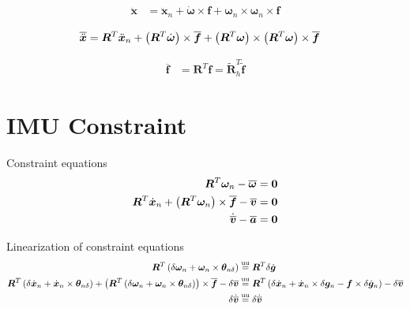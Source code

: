 \documentclass{article}
\newcommand{\T}[1]{\bm{#1}}
\newcommand{\TT}[1]{\bm{#1}}
\newcommand{\equu}{\overset{\text{uu}}{=}}
\begin{document}
\begin{align}
	\ddot{\T{x}}
	&=
	\ddot{\T{x}}_n
	+
	\dot{\T{\omega}} \times \T{f}
	+
	\T{\omega}_n \times \T{\omega}_n \times \T{f}
\end{align}

\begin{align}
	\overline{\ddot{\T{x}}}
	&=
	\TT{R}^T \ddot{\T{x}}_n
	+
	\plbr{\TT{R}^T \dot{\T{\omega}}} \times \overline{\T{f}}
	+
	\plbr{\TT{R}^T \T{\omega}} \times \plbr{\TT{R}^T \T{\omega}} \times \overline{\T{f}}
\end{align}

\begin{align}
	\overline{\T{f}}
	&=
	\TT{R}^T \T{f}
	=
	\tilde{\TT{R}}_h^T \tilde{\T{f}}
\end{align}

\section{IMU Constraint}
Constraint equations
\begin{subequations}
\begin{align}
	\TT{R}^T \T{\omega}_n - \overline{\T{\omega}}
	&=
	\T{0}
	\\
	\TT{R}^T \dot{\T{x}}_n
	+
	\plbr{\TT{R}^T \T{\omega}_n} \times \overline{\T{f}}
	-
	\overline{\T{v}}
	&=
	\T{0}
	\\
	\dot{\overline{\T{v}}}
	-
	\overline{\T{a}}
	&=
	\T{0}
\end{align}
\end{subequations}

Linearization of constraint equations
\begin{subequations}
\begin{align}
	\TT{R}^T \plbr{
		\delta\T{\omega}_n
		+
		\T{\omega}_n \times \T{\theta}_{n\delta}
	}
	&\equu
	\TT{R}^T \delta\dot{\T{g}}
	\\
	\TT{R}^T \plbr{
		\delta\dot{\T{x}}_n
		+
		\dot{\T{x}}_n \times \T{\theta}_{n\delta}
	}
	+
	\plbr{
		\TT{R}^T \plbr{
			\delta\T{\omega}_n
			+
			\T{\omega}_n \times \T{\theta}_{n\delta}
		}
	} \times \overline{\T{f}}
	-
	\delta\overline{\T{v}}
	&\equu
	\TT{R}^T \plbr{
		\delta\dot{\T{x}}_n
		+
		\dot{\T{x}}_n \times \delta\T{g}_n
		-
		\T{f} \times \delta\dot{\T{g}}_n
	}
	-
	\delta\overline{\T{v}}
	\\
	\delta\dot{\overline{\T{v}}}
	&\equu
	\delta\dot{\overline{\T{v}}}
\end{align}
\end{subequations}
\end{document}
